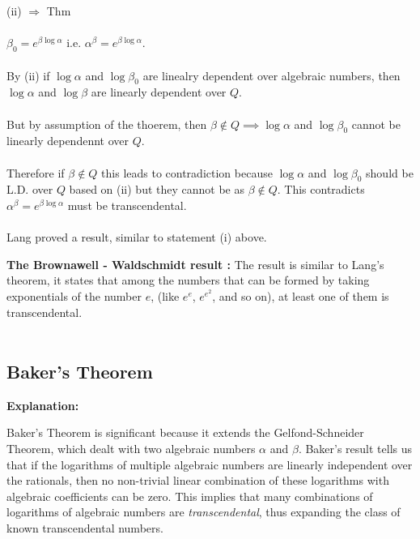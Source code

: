 \documentclass{article}
\begin{document}
(ii) $\Rightarrow$ Thm\\\\

$\beta_0 = e^{\beta \log \alpha}$ i.e. $\alpha^{\beta} = e^{\beta \log \alpha}$.\\\\
By (ii) if $\log \alpha$ and $\log \beta_0$ are linealry dependent over algebraic numbers, then
$\log \alpha$ and $\log \beta$ are linearly dependent over $Q$.\\\\
But by assumption of the thoerem, then $\beta \not \in Q \implies \log \alpha$ and $\log \beta_0$ cannot be 
linearly dependennt over $Q$.\\\\
Therefore if $\beta \not\in Q$ this leads to contradiction because 
$\log \alpha$ and $\log \beta_0$ should be L.D. over $Q$ based on (ii) but they cannot be 
as $\beta \not\in Q$. This contradicts $\alpha^{\beta} = e^{\beta \log \alpha}$ must be transcendental.\\\\
Lang proved a result, similar to statement (i) above.\\

\textbf{The Brownawell - Waldschmidt result :} The result is similar to Lang's 
theorem, it states that among the numbers that can be formed by taking exponentials of the number 
$e$, (like $e^{e}$, $e^{e^{2}}$, and so on), at least one of them is transcendental.\\\\

\subsection{Baker's Theorem}

\textbf{Explanation:} 

Baker's Theorem is significant because it extends the Gelfond-Schneider Theorem, which dealt with two algebraic numbers $\alpha$ and $\beta$. Baker's result tells us that if the logarithms of multiple algebraic numbers are linearly independent over the rationals, then no non-trivial linear combination of these logarithms with algebraic coefficients can be zero. This implies that many combinations of logarithms of algebraic numbers are \emph{transcendental}, thus expanding the class of known transcendental numbers.\\\\
\end{document}
